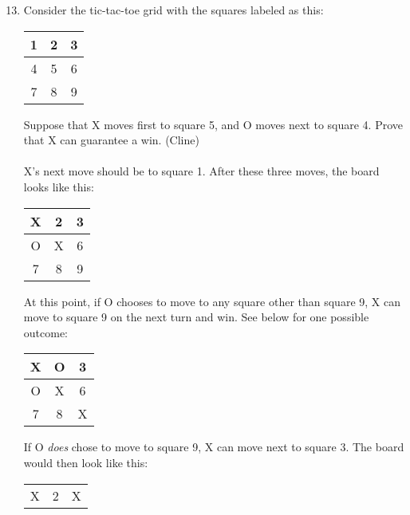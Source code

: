 \documentclass{article}
\begin{document}
\begin{enumerate}
      \setcounter{enumi}{12}
      \item Consider the tic-tac-toe grid with the squares labeled as this:
            \begin{center}
                  \begin{tabular}{c|c|c}
                        1 & 2 & 3 \\
                        \hline
                        4 & 5 & 6 \\
                        \hline
                        7 & 8 & 9
                  \end{tabular}
            \end{center}
            Suppose that X moves first to square 5, and O moves next to square 4. Prove that X can
            guarantee a win. (Cline)\\\\
            X's next move should be to square 1.
            After these three moves, the board looks like this:
            \begin{center}
                  \begin{tabular}{c|c|c}
                        X & 2 & 3 \\
                        \hline
                        O & X & 6 \\
                        \hline
                        7 & 8 & 9
                  \end{tabular}
            \end{center}
            At this point, if O chooses to move to any square other than square 9, X can move to square 9 on the next turn and win. See below for one possible outcome:
            \begin{center}
                  \begin{tabular}{c|c|c}
                        X & O & 3 \\
                        \hline
                        O & X & 6 \\
                        \hline
                        7 & 8 & X
                  \end{tabular}
            \end{center}
            If O \textit{does} chose to move to square 9, X can move next to square 3. The board would then look like this:
            \begin{center}
                  \begin{tabular}{c|c|c}
                        X & 2 & X \\

\end{tabular}
\end{center}
\end{enumerate}
\end{document}
